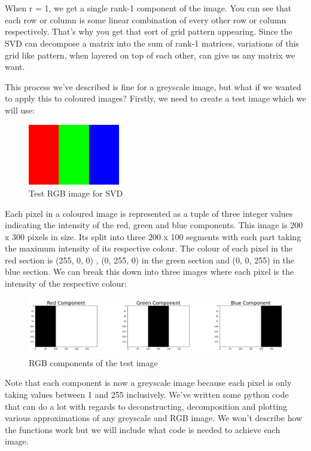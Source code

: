 \documentclass[a4paper,12pt]{article}
\begin{document}
	\\\\
	When r = 1, we get a single rank-1 component of the image. You can see that each row or column is some linear combination of every other row or column respectively. That's why you get that sort of grid pattern appearing. Since the SVD can decompose a matrix into the sum of rank-1 matrices, variations of this grid like pattern, when layered on top of each other, can give us any matrix we want. 
	
	This process we've described is fine for a greyscale image, but what if we wanted to apply this to coloured images? Firstly, we need to create a test image which we will use:
	
	\begin{figure}[h]
		\centering
		\includegraphics*[width = 4cm]{test_image.png}
		\caption{Test RGB image for SVD}
	\end{figure}
	
	Each pixel in a coloured image is represented as a tuple of three integer values indicating the intensity of the red, green and blue components. This image is 200 x 300 pixels in size. Its split into three 200 x 100 segments with each part taking the maximum intensity of its respective colour. The colour of each pixel in the red section is (255, 0, 0) , (0, 255, 0) in the green section and (0, 0, 255) in the blue section. We can break this down into three images where each pixel is the intensity of the respective colour:
	\begin{figure}[h]
		\centering
		\includegraphics*[width = 13cm]{test_image_rgb_plot.png}
		\caption{RGB components of the test image}
	\end{figure}
	
	Note that each component is now a greyscale image because each pixel is only taking values between 1 and 255 inclusively. We've written some python code that can do a lot with regards to deconstructing, decomposition and plotting various approximations of any greyscale and RGB image. We won't describe how the functions work but we will include what code is needed to achieve each image. 
	
\end{document}

